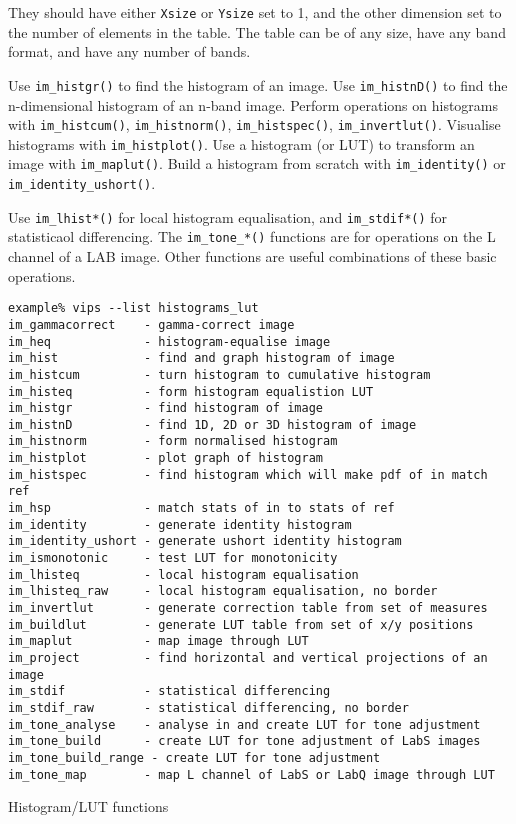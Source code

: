 They should have either \verb+Xsize+ or \verb+Ysize+ set to 1, and the
other dimension set to the number of elements in the table. The table can be
of any size, have any band format, and have any number of bands.

Use \verb+im_histgr()+ to find the histogram of an image.  Use
\verb+im_histnD()+ to find the n-dimensional histogram of an n-band
image.  Perform operations on histograms with \verb+im_histcum()+,
\verb+im_histnorm()+, \verb+im_histspec()+, \verb+im_invertlut()+. Visualise
histograms with \verb+im_histplot()+. Use a histogram (or LUT) to transform
an image with \verb+im_maplut()+. Build a histogram from scratch with
\verb+im_identity()+ or \verb+im_identity_ushort()+.

Use \verb+im_lhist*()+ for local histogram equalisation, and
\verb+im_stdif*()+ for statisticaol differencing. The \verb+im_tone_*()+
functions are for operations on the L channel of a LAB image. Other
functions are useful combinations of these basic operations.

\begin{fig2}
\begin{verbatim}
example% vips --list histograms_lut
im_gammacorrect    - gamma-correct image
im_heq             - histogram-equalise image
im_hist            - find and graph histogram of image
im_histcum         - turn histogram to cumulative histogram
im_histeq          - form histogram equalistion LUT
im_histgr          - find histogram of image
im_histnD          - find 1D, 2D or 3D histogram of image
im_histnorm        - form normalised histogram
im_histplot        - plot graph of histogram
im_histspec        - find histogram which will make pdf of in match ref
im_hsp             - match stats of in to stats of ref
im_identity        - generate identity histogram
im_identity_ushort - generate ushort identity histogram
im_ismonotonic     - test LUT for monotonicity
im_lhisteq         - local histogram equalisation
im_lhisteq_raw     - local histogram equalisation, no border
im_invertlut       - generate correction table from set of measures
im_buildlut        - generate LUT table from set of x/y positions
im_maplut          - map image through LUT
im_project         - find horizontal and vertical projections of an image
im_stdif           - statistical differencing
im_stdif_raw       - statistical differencing, no border
im_tone_analyse    - analyse in and create LUT for tone adjustment
im_tone_build      - create LUT for tone adjustment of LabS images
im_tone_build_range - create LUT for tone adjustment
im_tone_map        - map L channel of LabS or LabQ image through LUT
\end{verbatim}
\caption{Histogram/LUT functions}
\label{fg:hist}
\end{fig2}
  
